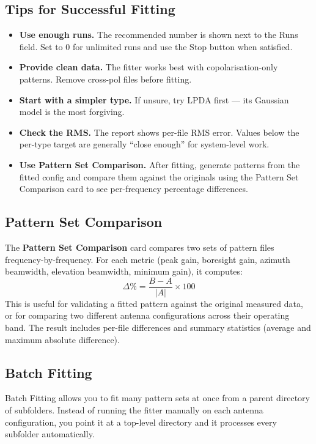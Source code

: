 \documentclass[11pt,a4paper]{article}
\begin{document}
\subsection{Tips for Successful Fitting}
\begin{itemize}
    \item \textbf{Use enough runs.} The recommended number is shown next to the Runs field. Set to 0 for unlimited runs and use the Stop button when satisfied.
    \item \textbf{Provide clean data.} The fitter works best with copolarisation-only patterns. Remove cross-pol files before fitting.
    \item \textbf{Start with a simpler type.} If unsure, try LPDA first --- its Gaussian model is the most forgiving.
    \item \textbf{Check the RMS.} The report shows per-file RMS error. Values below the per-type target are generally ``close enough'' for system-level work.
    \item \textbf{Use Pattern Set Comparison.} After fitting, generate patterns from the fitted config and compare them against the originals using the Pattern Set Comparison card to see per-frequency percentage differences.
\end{itemize}

\subsection{Pattern Set Comparison}
The \textbf{Pattern Set Comparison} card compares two sets of pattern files frequency-by-frequency. For each metric (peak gain, boresight gain, azimuth beamwidth, elevation beamwidth, minimum gain), it computes:
\[ \Delta\% = \frac{B - A}{|A|} \times 100 \]
This is useful for validating a fitted pattern against the original measured data, or for comparing two different antenna configurations across their operating band. The result includes per-file differences and summary statistics (average and maximum absolute difference).

\subsection{Batch Fitting}
Batch Fitting allows you to fit many pattern sets at once from a parent directory of subfolders. Instead of running the fitter manually on each antenna configuration, you point it at a top-level directory and it processes every subfolder automatically.
\end{document}
